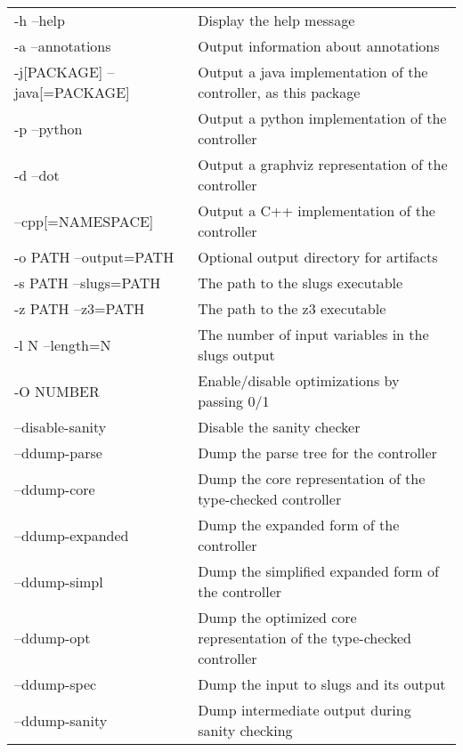 \begin{center}
\begin{tabular}{l@{\qquad}l}
-h --help                    & Display the help message \\
-a --annotations             & Output information about annotations \\
-j[PACKAGE] --java[=PACKAGE] & Output a java implementation of the controller, as this package\\
-p --python                  & Output a python implementation of the controller\\
-d --dot                     & Output a graphviz representation of the controller\\
--cpp[=NAMESPACE]            & Output a C++ implementation of the controller\\
-o PATH --output=PATH        & Optional output directory for artifacts\\
-s PATH --slugs=PATH         & The path to the slugs executable\\
-z PATH --z3=PATH            & The path to the z3 executable\\
-l N --length=N              & The number of input variables in the slugs output\\
-O NUMBER                    & Enable/disable optimizations by passing 0/1\\
--disable-sanity             & Disable the sanity checker\\
--ddump-parse                & Dump the parse tree for the controller\\
--ddump-core                 & Dump the core representation of the type-checked controller\\
--ddump-expanded             & Dump the expanded form of the controller\\
--ddump-simpl                & Dump the simplified expanded form of the controller\\
--ddump-opt                  & Dump the optimized core representation of the type-checked controller\\
--ddump-spec                 & Dump the input to slugs and its output\\
--ddump-sanity               & Dump intermediate output during sanity checking\\

\end{tabular}
\end{center}
